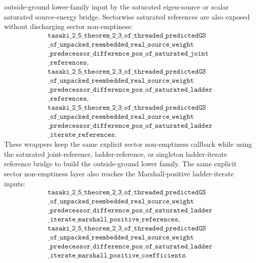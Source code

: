 \documentclass[a4paper,11pt]{article}
\begin{document}
outside-ground lower-family input by the saturated eigen-source or scalar
saturated source-energy bridge.
Sectorwise saturated references are also exposed without discharging sector
non-emptiness:
\[
\begin{gathered}
\texttt{tasaki\_2\_5\_theorem\_2\_3\_of\_threaded\_predictedGS}\\
\texttt{\_of\_unpacked\_reembedded\_real\_source\_weight}\\
\texttt{\_predecessor\_difference\_pos\_of\_saturated\_joint}\\
\texttt{\_references},\\
\texttt{tasaki\_2\_5\_theorem\_2\_3\_of\_threaded\_predictedGS}\\
\texttt{\_of\_unpacked\_reembedded\_real\_source\_weight}\\
\texttt{\_predecessor\_difference\_pos\_of\_saturated\_ladder}\\
\texttt{\_references},\\
\texttt{tasaki\_2\_5\_theorem\_2\_3\_of\_threaded\_predictedGS}\\
\texttt{\_of\_unpacked\_reembedded\_real\_source\_weight}\\
\texttt{\_predecessor\_difference\_pos\_of\_saturated\_ladder}\\
\texttt{\_iterate\_references}.
\end{gathered}
\]
These wrappers keep the same explicit sector non-emptiness callback while
using the saturated joint-reference, ladder-reference, or singleton
ladder-iterate reference bridge to build the outside-ground lower family.
The same explicit sector non-emptiness layer also reaches the
Marshall-positive ladder-iterate inputs:
\[
\begin{gathered}
\texttt{tasaki\_2\_5\_theorem\_2\_3\_of\_threaded\_predictedGS}\\
\texttt{\_of\_unpacked\_reembedded\_real\_source\_weight}\\
\texttt{\_predecessor\_difference\_pos\_of\_saturated\_ladder}\\
\texttt{\_iterate\_marshall\_positive\_references},\\
\texttt{tasaki\_2\_5\_theorem\_2\_3\_of\_threaded\_predictedGS}\\
\texttt{\_of\_unpacked\_reembedded\_real\_source\_weight}\\
\texttt{\_predecessor\_difference\_pos\_of\_saturated\_ladder}\\
\texttt{\_iterate\_marshall\_positive\_coefficients}.
\end{gathered}
\]
\end{document}
